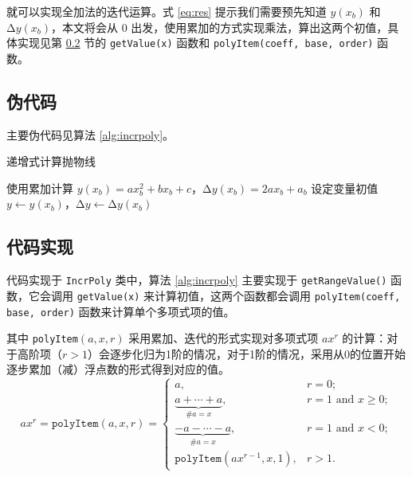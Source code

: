 \documentclass[math-font=newcm]{sjtuarticle}
\begin{document}
就可以实现全加法的迭代运算。式 \eqref{eq:res} 提示我们需要预先知道 $y(x_b)$ 和 $\increment y(x_b)$，本文将会从 0 出发，使用累加的方式实现乘法，算出这两个初值，具体实现见第 \ref{sec:code} 节的 \verb"getValue(x)" 函数和 \verb"polyItem(coeff, base, order)" 函数。

\subsection{伪代码}

主要伪代码见算法 \ref{alg:incrpoly}。

\begin{algorithm}[H]
    \caption{递增式计算抛物线}
    \label{alg:incrpoly}
    \BlankLine
    使用累加计算 $y(x_b)=ax_b^2+bx_b+c$，$\increment y(x_b)=2ax_b+a_b$\;
    设定变量初值 $y\leftarrow y(x_b)$，$\increment y\leftarrow \increment y(x_b)$\;
    \;
\end{algorithm}

\subsection{代码实现}\label{sec:code}

代码实现于 \verb"IncrPoly" 类中，算法 \ref{alg:incrpoly} 主要实现于 \verb"getRangeValue()" 函数，它会调用 \verb"getValue(x)" 来计算初值，这两个函数都会调用 \verb"polyItem(coeff, base, order)" 函数来计算单个多项式项的值。

其中 \verb"polyItem"$(a,x,r)$ 采用累加、迭代的形式实现对多项式项 $ax^r$ 的计算：对于高阶项（$r>1$）会逐步化归为1阶的情况，对于1阶的情况，采用从0的位置开始逐步累加（减）浮点数的形式得到对应的值。
\begin{equation}
    ax^r=\texttt{polyItem}(a,x,r)=\begin{cases}
        a, & r=0;\\
        \underbrace{a+\cdots+a}_{\#a=x} , & r=1\text{ and }x\geq 0;\\
        \underbrace{-a-\cdots-a}_{\#a=x} ,  & r=1\text{ and }x<0;\\
        \texttt{polyItem}(ax^{r-1},x,1), & r>1.
    \end{cases}
\end{equation}
\end{document}
